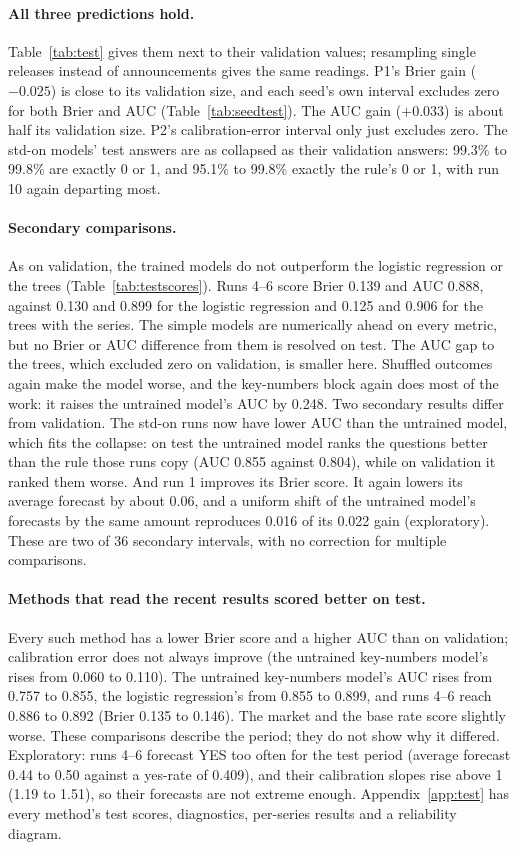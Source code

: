 \documentclass[11pt]{article}
\begin{document}
\paragraph{All three predictions hold.} Table~\ref{tab:test} gives them next to their validation values; resampling single releases instead of announcements gives the same readings. P1's Brier gain ($-0.025$) is close to its validation size, and each seed's own interval excludes zero for both Brier and AUC (Table~\ref{tab:seedtest}). The AUC gain ($+0.033$) is about half its validation size. P2's calibration-error interval only just excludes zero. The std-on models' test answers are as collapsed as their validation answers: 99.3\% to 99.8\% are exactly 0 or 1, and 95.1\% to 99.8\% exactly the rule's 0 or 1, with run 10 again departing most.

\paragraph{Secondary comparisons.} As on validation, the trained models do not outperform the logistic regression or the trees (Table~\ref{tab:testscores}). Runs 4--6 score Brier 0.139 and AUC 0.888, against 0.130 and 0.899 for the logistic regression and 0.125 and 0.906 for the trees with the series. The simple models are numerically ahead on every metric, but no Brier or AUC difference from them is resolved on test. The AUC gap to the trees, which excluded zero on validation, is smaller here. Shuffled outcomes again make the model worse, and the key-numbers block again does most of the work: it raises the untrained model's AUC by 0.248. Two secondary results differ from validation. The std-on runs now have lower AUC than the untrained model, which fits the collapse: on test the untrained model ranks the questions better than the rule those runs copy (AUC 0.855 against 0.804), while on validation it ranked them worse. And run 1 improves its Brier score. It again lowers its average forecast by about 0.06, and a uniform shift of the untrained model's forecasts by the same amount reproduces 0.016 of its 0.022 gain (exploratory). These are two of 36 secondary intervals, with no correction for multiple comparisons.

\paragraph{Methods that read the recent results scored better on test.} Every such method has a lower Brier score and a higher AUC than on validation; calibration error does not always improve (the untrained key-numbers model's rises from 0.060 to 0.110). The untrained key-numbers model's AUC rises from 0.757 to 0.855, the logistic regression's from 0.855 to 0.899, and runs 4--6 reach 0.886 to 0.892 (Brier 0.135 to 0.146). The market and the base rate score slightly worse. These comparisons describe the period; they do not show why it differed. Exploratory: runs 4--6 forecast YES too often for the test period (average forecast 0.44 to 0.50 against a yes-rate of 0.409), and their calibration slopes rise above 1 (1.19 to 1.51), so their forecasts are not extreme enough. Appendix~\ref{app:test} has every method's test scores, diagnostics, per-series results and a reliability diagram.
\end{document}
